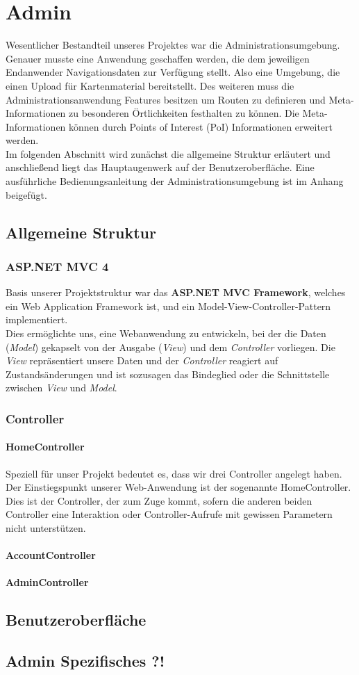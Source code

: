 \chapter{Admin}
Wesentlicher Bestandteil unseres Projektes war die Administrationsumgebung. Genauer musste eine Anwendung geschaffen werden, die dem jeweiligen Endanwender Navigationsdaten zur Verfügung stellt. Also eine Umgebung, die einen Upload für Kartenmaterial bereitstellt. Des weiteren muss die Administrationsanwendung Features besitzen um Routen zu definieren und Meta-Informationen zu besonderen Örtlichkeiten festhalten zu können. Die Meta-Informationen können durch Points of Interest (PoI) Informationen erweitert werden.\\
Im folgenden Abschnitt wird zunächst die allgemeine Struktur erläutert und anschließend liegt das Hauptaugenwerk auf der Benutzeroberfläche. Eine ausführliche Bedienungsanleitung der Administrationsumgebung ist im Anhang beigefügt.

\section{Allgemeine Struktur}
\subsection*{ASP.NET MVC 4}
Basis unserer Projektstruktur war das \textbf{ASP.NET MVC Framework}, welches ein Web Application Framework ist, und ein Model-View-Controller-Pattern implementiert.\\
Dies ermöglichte uns, eine Webanwendung zu entwickeln, bei der die Daten (\textit{Model}) gekapselt von der Ausgabe (\textit{View}) und dem \textit{Controller} vorliegen. Die \textit{View} repräsentiert unsere Daten und der \textit{Controller} reagiert auf Zustandsänderungen und ist sozusagen das Bindeglied oder die Schnittstelle zwischen \textit{View} und \textit{Model}.
\subsection*{Controller}
\subsubsection*{HomeController}
Speziell für unser Projekt bedeutet es, dass wir drei Controller angelegt haben. Der Einstiegspunkt unserer Web-Anwendung ist der sogenannte HomeController. Dies ist der Controller, der zum Zuge kommt, sofern die anderen beiden Controller eine Interaktion oder Controller-Aufrufe mit gewissen Parametern nicht unterstützen.
\subsubsection*{AccountController}
\subsubsection*{AdminController}



\section{Benutzeroberfläche}
\section{Admin Spezifisches ?!}

